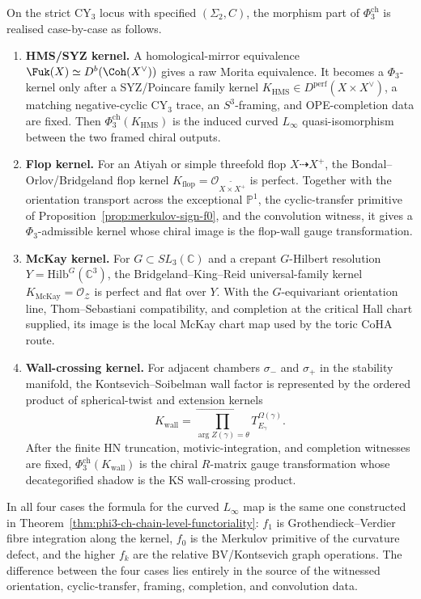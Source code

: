 \begin{proposition}
\label{prop:phi3-casewise-witnessed-kernels}
On the strict CY$_3$ locus with specified $(\Sigma_2,C)$, the morphism part
of $\Phi_3^{\mathrm{ch}}$ is realised case-by-case as follows.
\begin{enumerate}[label=\textup{(\roman*)}]
\item \textbf{HMS/SYZ kernel.} A homological-mirror equivalence
$\Fuk(X)\simeq D^b(\Coh(X^\vee))$ gives a raw Morita equivalence. It
becomes a $\Phi_3$-kernel only after a SYZ/Poincare family kernel
$K_{\mathrm{HMS}}\in D^{\mathrm{perf}}(X\times X^\vee)$, a matching
negative-cyclic CY$_3$ trace, an $S^3$-framing, and OPE-completion
data are fixed. Then $\Phi_3^{\mathrm{ch}}(K_{\mathrm{HMS}})$ is the
induced curved $L_\infty$ quasi-isomorphism between the two framed
chiral outputs.
\item \textbf{Flop kernel.} For an Atiyah or simple threefold flop
$X\dashrightarrow X^+$, the Bondal--Orlov/Bridgeland flop kernel
$K_{\mathrm{flop}}=\mathcal O_{\widetilde{X\times X^+}}$ is perfect.
Together with the orientation transport across the exceptional
$\mathbb P^1$, the cyclic-transfer primitive of
Proposition~\ref{prop:merkulov-sign-f0}, and the convolution witness,
it gives a $\Phi_3$-admissible kernel whose chiral image is the
flop-wall gauge transformation.
\item \textbf{McKay kernel.} For $G\subset SL_3(\mathbb C)$ and a
crepant $G$-Hilbert resolution $Y=\mathrm{Hilb}^G(\mathbb C^3)$, the
Bridgeland--King--Reid universal-family kernel
$K_{\mathrm{McKay}}=\mathcal O_{\mathcal Z}$ is perfect and flat over
$Y$. With the $G$-equivariant orientation line, Thom--Sebastiani
compatibility, and completion at the critical Hall chart supplied, its
image is the local McKay chart map used by the toric CoHA route.
\item \textbf{Wall-crossing kernel.} For adjacent chambers
$\sigma_-$ and $\sigma_+$ in the stability manifold, the
Kontsevich--Soibelman wall factor is represented by the ordered product
of spherical-twist and extension kernels
\[
 K_{\mathrm{wall}}
 =
 \prod_{\arg Z(\gamma)=\theta}^{\rightarrow} T_{E_\gamma}^{\Omega(\gamma)}.
\]
After the finite HN truncation, motivic-integration, and completion
witnesses are fixed, $\Phi_3^{\mathrm{ch}}(K_{\mathrm{wall}})$ is the
chiral $R$-matrix gauge transformation whose decategorified shadow is
the KS wall-crossing product.
\end{enumerate}
In all four cases the formula for the curved $L_\infty$ map is the same
one constructed in Theorem~\ref{thm:phi3-ch-chain-level-functoriality}:
$f_1$ is Grothendieck--Verdier fibre integration along the kernel,
$f_0$ is the Merkulov primitive of the curvature defect, and the higher
$f_k$ are the relative BV/Kontsevich graph operations. The difference
between the four cases lies entirely in the source of the witnessed
orientation, cyclic-transfer, framing, completion, and convolution data.
\end{proposition}


